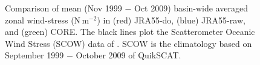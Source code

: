 \documentclass[dvipdfmx]{elsarticle_mod}
\begin{document}
\begin{figure}[h]
  \centering
  \caption{Comparison of mean (Nov 1999 $-$ Oct 2009) basin-wide averaged zonal wind-stress ($\mathrm{N}\,\mathrm{m}^{-2}$) in (red) JRA55-do, (blue) JRA55-raw, and (green) CORE. The black lines plot the Scatterometer Oceanic Wind Stress (SCOW) data of \citet{Risien_and_Chelton_2008}. SCOW is the climatology based on September 1999 $-$ October 2009 of QuikSCAT.}
  \label{fig:comp_taux_basin}
\end{figure}
\end{document}
